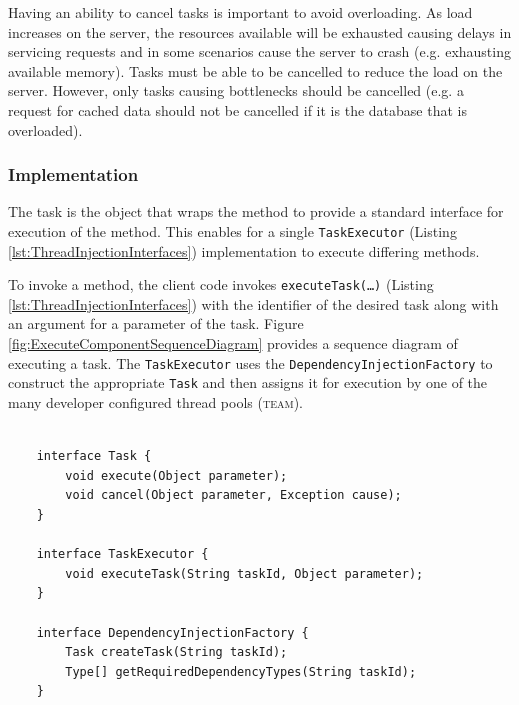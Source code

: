 \documentclass[prodmode]{style/acmlarge}
\begin{document}
Having an ability to cancel tasks is important to avoid overloading.  As
load increases on the server, the resources available will be exhausted causing
delays in servicing requests and in some scenarios cause the server to crash
(e.g. exhausting available memory).  Tasks must be able to be cancelled to
reduce the load on the server.  However, only tasks causing bottlenecks
should be cancelled (e.g. a request for cached data should not be cancelled if
it is the database that is overloaded).


\subsubsection*{Implementation}

The task is the object that wraps the method to provide a standard interface for
execution of the method.  This enables for a single \texttt{TaskExecutor}
(Listing \ref{lst:ThreadInjectionInterfaces}) implementation to execute
differing methods.

To invoke a method, the client code invokes \texttt{executeTask(\ldots)}
(Listing \ref{lst:ThreadInjectionInterfaces}) with the identifier of the desired
task along with an argument for a parameter of the task.  Figure
\ref{fig:ExecuteComponentSequenceDiagram} provides a sequence diagram of
executing a task.  The \texttt{TaskExecutor} uses the
\texttt{DependencyInjectionFactory} to construct the appropriate \texttt{Task}
and then assigns it for execution by one of the many developer configured thread
pools (\textsc{team}).

\begin{lstlisting}[float,label=lst:ThreadInjectionInterfaces]

    interface Task {
        void execute(Object parameter); 
        void cancel(Object parameter, Exception cause);
    }

    interface TaskExecutor {
        void executeTask(String taskId, Object parameter);
    }

    interface DependencyInjectionFactory {
        Task createTask(String taskId);
        Type[] getRequiredDependencyTypes(String taskId);
    }
\end{lstlisting}
\end{document}

